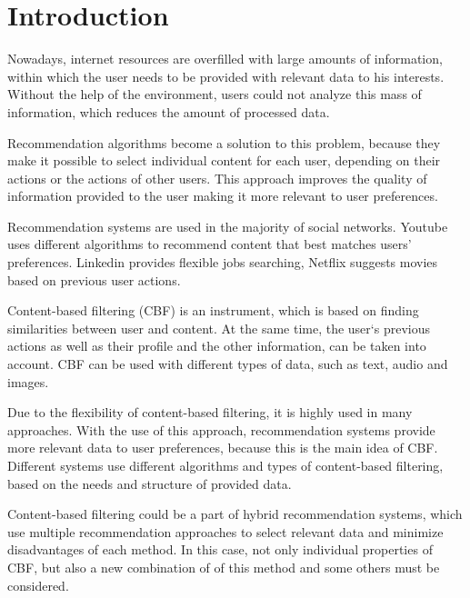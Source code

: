 \section{Introduction}\label{sec:introduction}
Nowadays, internet resources are overfilled with large amounts of information, within which the user needs to be provided with relevant data to his interests. Without the help of the environment, users could not analyze this mass of information, which reduces the amount of processed data\cite{InternetBigData}.

Recommendation algorithms become a solution to this problem, because they make it possible to select individual content for each user, depending on their actions or the actions of other users. This approach improves the quality of information provided to the user making it more relevant to user preferences\cite{IMRSUCBF}.

Recommendation systems are used in the majority of social networks. Youtube uses different algorithms to recommend content that best matches users' preferences. Linkedin provides flexible jobs searching, Netflix suggests movies based on previous user actions\cite{CBF_In_Social_Networks}.

Content-based filtering (CBF) is an instrument, which is based on finding similarities between user and content. At the same time, the user`s previous actions as well as their profile and the other information, can be taken into account. CBF can be used with different types of data, such as text, audio and images\cite{van2000using}.

Due to the flexibility of content-based filtering, it is highly used in many approaches. With the use of this approach, recommendation systems provide more relevant data to user preferences, because this is the main idea of CBF. Different systems use different algorithms and types of content-based filtering, based on the needs and structure of provided data. %

Content-based filtering could be a part of hybrid recommendation systems, which use multiple recommendation approaches to select relevant data and minimize disadvantages of each method. In this case, not only individual properties of CBF, but also a new combination of of this method and some others must be considered\cite{hybrid_systems}.

